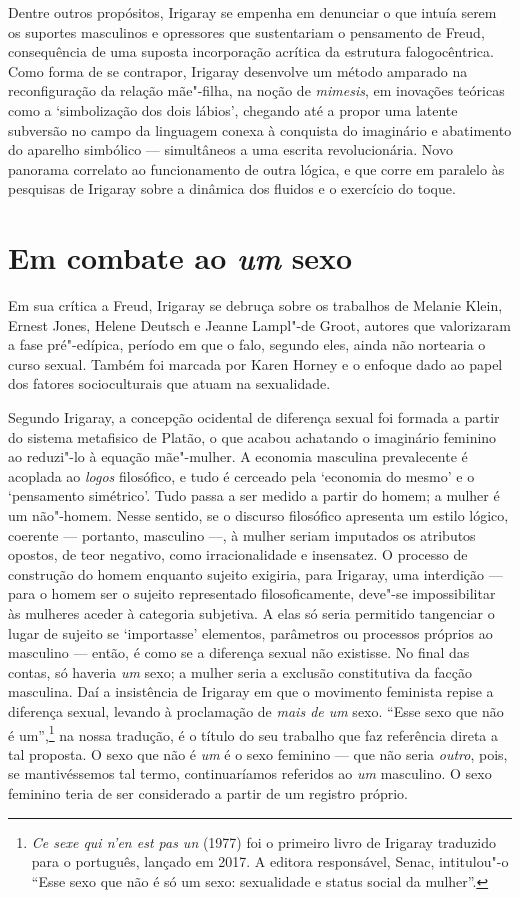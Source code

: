 Dentre outros propósitos, Irigaray se empenha em denunciar o que intuía
serem os suportes masculinos e opressores que sustentariam o pensamento
de Freud, consequência de uma suposta incorporação acrítica da estrutura
falogocêntrica. Como forma de se contrapor, Irigaray desenvolve um
método amparado na reconfiguração da relação mãe"-filha, na noção de
\emph{mimesis}, em inovações teóricas como a `simbolização dos dois
lábios', chegando até a propor uma latente subversão no campo da
linguagem conexa à conquista do imaginário e abatimento do aparelho
simbólico --- simultâneos a uma escrita revolucionária. Novo panorama
correlato ao funcionamento de outra lógica, e que corre em paralelo às
pesquisas de Irigaray sobre a dinâmica dos fluidos e o exercício do
toque.

\section{Em combate ao \emph{um} sexo}

Em sua crítica a Freud, Irigaray se debruça sobre os trabalhos de
Melanie Klein, Ernest Jones, Helene Deutsch e Jeanne Lampl"-de Groot,
autores que valorizaram a fase pré"-edípica, período em que o falo,
segundo eles, ainda não nortearia o curso sexual. Também foi marcada por
Karen Horney e o enfoque dado ao papel dos fatores socioculturais que
atuam na sexualidade.

Segundo Irigaray, a concepção ocidental de diferença sexual foi formada
a partir do sistema metafisico de Platão, o que acabou achatando o
imaginário feminino ao reduzi"-lo à equação mãe"-mulher. A economia
masculina prevalecente é acoplada ao \emph{logos} filosófico, e tudo é
cerceado pela `economia do mesmo' e o `pensamento simétrico'. Tudo passa
a ser medido a partir do homem; a mulher é um não"-homem. Nesse sentido,
se o discurso filosófico apresenta um estilo lógico, coerente ---
portanto, masculino ---, à mulher seriam imputados os atributos opostos,
de teor negativo, como irracionalidade e insensatez. O processo de
construção do homem enquanto sujeito exigiria, para Irigaray, uma
interdição --- para o homem ser o sujeito representado filosoficamente,
deve"-se impossibilitar às mulheres aceder à categoria subjetiva. A elas
só seria permitido tangenciar o lugar de sujeito se `importasse'
elementos, parâmetros ou processos próprios ao masculino --- então, é
como se a diferença sexual não existisse. No final das contas, só
haveria \emph{um} sexo; a mulher seria a exclusão constitutiva da facção
masculina. Daí a insistência de Irigaray em que o movimento feminista
repise a diferença sexual, levando à proclamação de \emph{mais de um}
sexo. ``Esse sexo que não é um'',\footnote{\emph{Ce sexe qui n'en est pas
  un} (1977) foi o primeiro livro de Irigaray traduzido para o
  português, lançado em 2017. A editora responsável, Senac, intitulou"-o
  ``Esse sexo que não é só um sexo: sexualidade e status social da
  mulher''.} na nossa tradução, é o título do seu trabalho que faz
referência direta a tal proposta. O sexo que não é \emph{um} é o sexo
feminino --- que não seria \emph{outro}, pois, se mantivéssemos tal
termo, continuaríamos referidos ao \emph{um} masculino. O sexo feminino
teria de ser considerado a partir de um registro próprio.

